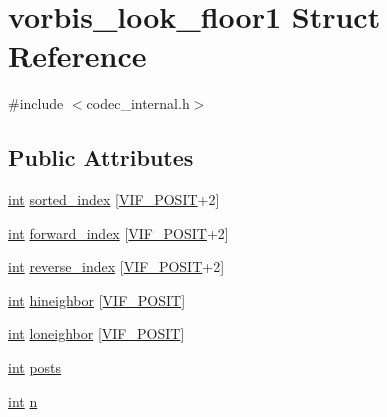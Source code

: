 \hypertarget{structvorbis__look__floor1}{}\section{vorbis\+\_\+look\+\_\+floor1 Struct Reference}
\label{structvorbis__look__floor1}


{\ttfamily \#include $<$codec\+\_\+internal.\+h$>$}

\subsection*{Public Attributes}
\begin{DoxyCompactItemize}
\item 
\hyperlink{xmltok_8h_a5a0d4a5641ce434f1d23533f2b2e6653}{int} \hyperlink{structvorbis__look__floor1_a629f0bee40a5c9a8f644e7df69f3dadb}{sorted\+\_\+index} \mbox{[}\hyperlink{backends_8h_ad98f1819ef37fdc1ed097bf953ed41a9}{V\+I\+F\+\_\+\+P\+O\+S\+IT}+2\mbox{]}
\item 
\hyperlink{xmltok_8h_a5a0d4a5641ce434f1d23533f2b2e6653}{int} \hyperlink{structvorbis__look__floor1_aef7094d8e6608a42938cf39a0f5373ab}{forward\+\_\+index} \mbox{[}\hyperlink{backends_8h_ad98f1819ef37fdc1ed097bf953ed41a9}{V\+I\+F\+\_\+\+P\+O\+S\+IT}+2\mbox{]}
\item 
\hyperlink{xmltok_8h_a5a0d4a5641ce434f1d23533f2b2e6653}{int} \hyperlink{structvorbis__look__floor1_a6743f31bc487a907f36876a98a5bf0ec}{reverse\+\_\+index} \mbox{[}\hyperlink{backends_8h_ad98f1819ef37fdc1ed097bf953ed41a9}{V\+I\+F\+\_\+\+P\+O\+S\+IT}+2\mbox{]}
\item 
\hyperlink{xmltok_8h_a5a0d4a5641ce434f1d23533f2b2e6653}{int} \hyperlink{structvorbis__look__floor1_a81fcfd46dab832da0709459a76aa80e2}{hineighbor} \mbox{[}\hyperlink{backends_8h_ad98f1819ef37fdc1ed097bf953ed41a9}{V\+I\+F\+\_\+\+P\+O\+S\+IT}\mbox{]}
\item 
\hyperlink{xmltok_8h_a5a0d4a5641ce434f1d23533f2b2e6653}{int} \hyperlink{structvorbis__look__floor1_ae5d2a437f26594d0b254b3b7c802377d}{loneighbor} \mbox{[}\hyperlink{backends_8h_ad98f1819ef37fdc1ed097bf953ed41a9}{V\+I\+F\+\_\+\+P\+O\+S\+IT}\mbox{]}
\item 
\hyperlink{xmltok_8h_a5a0d4a5641ce434f1d23533f2b2e6653}{int} \hyperlink{structvorbis__look__floor1_ad6b1755af6760f3236c1f937c4c50edc}{posts}
\item 
\hyperlink{xmltok_8h_a5a0d4a5641ce434f1d23533f2b2e6653}{int} \hyperlink{structvorbis__look__floor1_ae51b0aedc2263f6f31d44299c283ab52}{n}

\end{DoxyCompactItemize}
